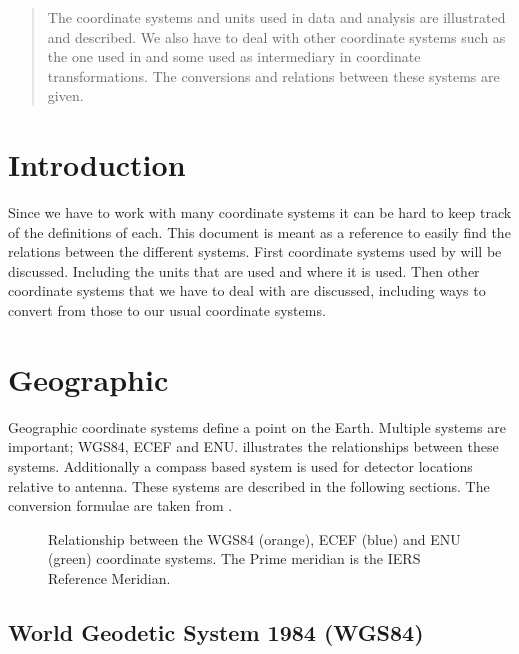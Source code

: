 \begin{abstract}

The coordinate systems and units used in \hisparc data and analysis are
illustrated and described. We also have to deal with other coordinate
systems such as the one used in \corsika and some used as intermediary
in coordinate transformations. The conversions and relations between
these systems are given.

\end{abstract}


\section{Introduction}

Since we have to work with many coordinate systems it can be hard to
keep track of the definitions of each. This document is meant as a
reference to easily find the relations between the different systems.
First coordinate systems used by \hisparc will be discussed. Including
the units that are used and where it is used. Then other coordinate
systems that we have to deal with are discussed, including ways to
convert from those to our usual coordinate systems.


\section{Geographic}

Geographic coordinate systems define a point on the Earth. Multiple
systems are important; WGS84, ECEF and ENU. 
illustrates the relationships between these systems. Additionally a
compass based system is used for detector locations relative to \gps
antenna. These systems are described in the following sections. The
conversion formulae are taken from \cite{wikipedia:2014aa}.

\begin{figure}
    \centering
    
    \caption{Relationship between the WGS84 (orange), ECEF (blue) and ENU
             (green) coordinate systems. The Prime meridian is the IERS
             Reference Meridian.}
    \label{fig:wgs84_ecef_enu}
\end{figure}


\subsection{World Geodetic System 1984 (WGS84)}

